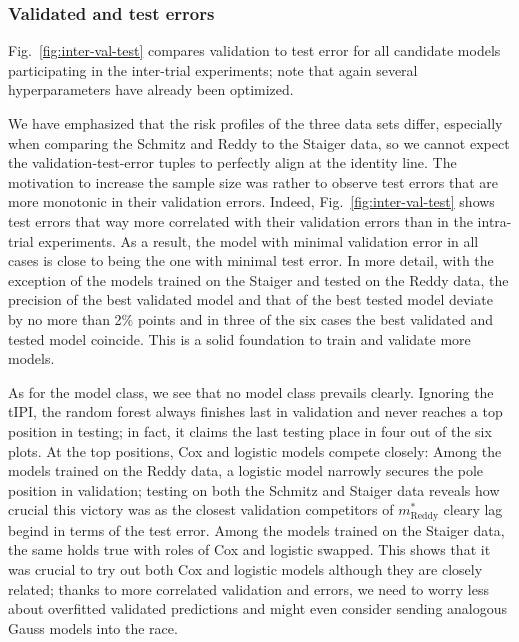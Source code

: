 \subsubsection{Validated and test errors}



Fig.\ \ref{fig:inter-val-test} compares validation to test error for all candidate models 
participating in the inter-trial experiments; note that again several hyperparameters have already 
been optimized. 

We have emphasized that the risk profiles of the three data sets differ, especially when comparing 
the Schmitz and Reddy to the Staiger data, so we cannot expect the validation-test-error tuples 
to perfectly align at the identity line. The motivation to increase the sample size was rather 
to observe test errors that are more monotonic in their validation errors. Indeed, Fig.\ 
\ref{fig:inter-val-test} shows test errors that way more correlated with their validation errors 
than in the intra-trial experiments. As a result, the model with minimal validation error in all 
cases is close to being the one with minimal test error. In more detail, with the exception of 
the models trained on the Staiger and tested on the Reddy data, the precision of the best 
validated model and that of the best tested model deviate by no more than \num{2}\% points and in 
three of the six cases the best validated and tested model coincide. This is a solid foundation 
to train and validate more models.

As for the model class, we see that no model class prevails clearly. Ignoring the tIPI, the random 
forest always finishes last in validation and never reaches a top position in testing; in fact, 
it claims the last testing place in four out of the six plots. At the top positions, Cox and 
logistic models compete closely: Among the models trained on the Reddy data, a logistic model 
narrowly secures the pole position in validation; testing on both the Schmitz and Staiger 
data reveals how crucial this victory was as the closest validation competitors of 
$m^*_\text{Reddy}$ cleary lag begind in terms of the test error. Among the models trained on the 
Staiger data, the same holds true with roles of Cox and logistic swapped. This shows that it 
was crucial to try out both Cox and logistic models although they are closely related; thanks to 
more correlated validation and errors, we need to worry less about overfitted validated 
predictions and might even consider sending analogous Gauss models into the race.

